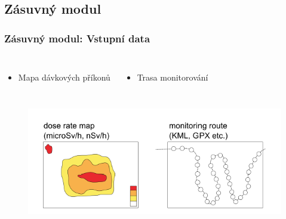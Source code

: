 \documentclass{beamer}
\begin{document}
\begin{frame}
\section{Zásuvný modul}
\frametitle{Zásuvný modul: Vstupní data}
\begin{columns}
	 \centering
		\begin{itemize}
			\item Mapa dávkových příkonů
		\end{itemize}
	 \centering
		\begin{itemize}
			\item Trasa monitorování
		\end{itemize}
\end{columns}
\begin{figure}[H] \centering	
	\includegraphics[scale=0.67]{./pictures/input.png}
\end{figure}

\end{frame}
\end{document}

